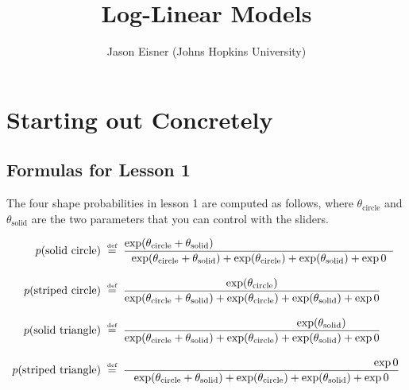 \documentclass[11pt]{article}
\newcommand{\defeq}{\;\stackrel{\mbox{\tiny def}}{=}\;}
\begin{document}
\title{\vspace{-2cm}Log-Linear Models}
\author{Jason Eisner (Johns Hopkins University)}
\date{}
\maketitle

\begin{center}
\end{center}

\section{Starting out Concretely}\label{sec:concrete}

\subsection{Formulas for Lesson 1}

The four shape probabilities in lesson 1 are computed as follows,
where $\theta_{\textrm{circle}}$ and $\theta_{\textrm{solid}}$ are the
two parameters that you can control with the sliders.


\begin{align}
p(\text{solid circle}) & \defeq \frac{\exp (\theta_{\textrm{circle}}+\theta_{\textrm{solid}})\hspace{57mm}}{\exp (\theta_{\textrm{circle}} + \theta_{\textrm{solid}}) + \exp (\theta_{\textrm{circle}}) + \exp (\theta_{\textrm{solid}}) + \exp 0} \label{eqn:solidcircle}\\
\rule{0in}{1.5\baselineskip}
p(\text{striped circle}) & \defeq \frac{\exp (\theta_{\textrm{circle}})\hspace{0mm}}{\exp (\theta_{\textrm{circle}} + \theta_{\textrm{solid}}) + \exp (\theta_{\textrm{circle}}) + \exp (\theta_{\textrm{solid}}) + \exp 0} \label{eqn:stripedcircle}\\
\rule{0in}{1.5\baselineskip}
p(\text{solid triangle}) & \defeq \frac{\hspace{44mm}\exp (\theta_{\textrm{solid}})}{\exp (\theta_{\textrm{circle}} + \theta_{\textrm{solid}}) + \exp (\theta_{\textrm{circle}}) + \exp (\theta_{\textrm{solid}}) + \exp 0} \label{eqn:solidtriangle}\\
\rule{0in}{1.5\baselineskip}
p(\text{striped triangle}) & \defeq \frac{\hspace{79mm}\exp 0}{\exp (\theta_{\textrm{circle}} + \theta_{\textrm{solid}}) + \exp (\theta_{\textrm{circle}}) + \exp (\theta_{\textrm{solid}}) + \exp 0} \label{eqn:stripedtriangle}
\end{align}
\end{document}
